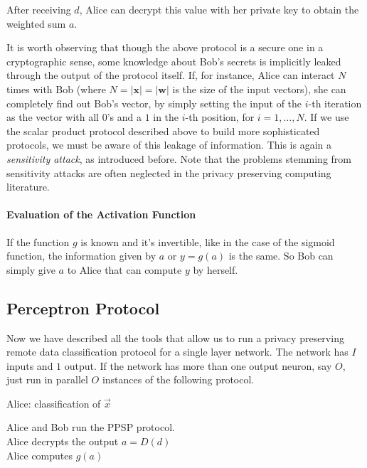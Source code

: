 \documentclass[11pt,oribibl,runningheads]{llncs}
\begin{document}
After receiving $d$, Alice can decrypt this value with her private
key to obtain the weighted sum $a$.

It is worth observing that though the above protocol is a secure one
in a cryptographic sense, some knowledge about Bob's secrets is
implicitly leaked through the output of the protocol itself. If, for
instance, Alice can interact $N$ times with Bob (where
$N=|\mathbf{x}|=|\mathbf{w}|$ is the size of the input vectors), she
can completely find out Bob's vector, by simply setting the input of
the $i$-th iteration as the vector with all $0$'s and a $1$ in the
$i$-th position, for $i = 1, \ldots, N$. If we use the scalar
product protocol described above to build more sophisticated
protocols, we must be aware of this leakage of information. This is
again a {\em sensitivity attack}, as introduced before. Note that
the problems stemming from sensitivity attacks are often neglected
in the privacy preserving computing literature.

\paragraph{Evaluation of the Activation Function}

If the function $g$ is known and
it's invertible, like in the case of the sigmoid function, the information given by $a$ or $y=g(a)$ is the same. So  Bob can simply give $a$ to
Alice that can compute $y$ by herself.

\subsection{Perceptron Protocol}
\label{sec.PP}

Now we have described all the tools that allow us to run a privacy
preserving remote data classification protocol for a single layer
network. The network has $I$ inputs and $1$ output. If the network
has more than one output neuron, say $O$, just run in parallel $O$
instances of the following protocol.

\begin{algorithm}
%
\label{alg:Percpetron}
 {Alice: classification of $\vec{x}$}
%
\begin{algtab}
Alice and Bob run the \textsc{PPSP} protocol.\\
Alice decrypts the output $a=D(d)$ \\
Alice computes $g(a)$\\
\end{algtab}
\end{algorithm}
%
\end{document}
